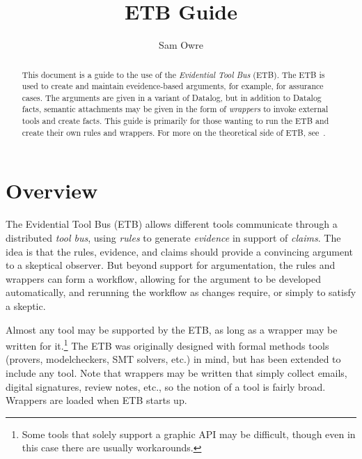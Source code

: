\documentclass{report}
\title{ETB Guide}
\author{Sam Owre}
\begin{document}
\maketitle
\tableofcontents

\begin{abstract}

This document is a guide to the use of the \textit{Evidential Tool Bus}
(ETB).  The ETB is used to create and maintain eveidence-based arguments,
for example, for assurance cases.  The arguments are given in a variant of
Datalog, but in addition to Datalog facts, semantic attachments may be
given in the form of \emph{wrappers} to invoke external tools and create
facts.  This guide is primarily for those wanting to run the ETB and
create their own rules and wrappers.  For more on the theoretical side of
ETB, see~\cite{DBLP:conf/vmcai/CruanesHOS13,
DBLP:conf/birthday/CruanesHMOS14}.

\end{abstract}


\chapter{Overview}

The Evidential Tool Bus (ETB) allows different tools communicate through a
distributed \emph{tool bus}, using \emph{rules} to generate
\emph{evidence} in support of \emph{claims}.  The idea is that the rules,
evidence, and claims should provide a convincing argument to a skeptical
observer.  But beyond support for argumentation, the rules and wrappers
can form a workflow, allowing for the argument to be developed automatically, 
and rerunning the workflow as changes require, or simply to satisfy a
skeptic.

Almost any tool may be supported by the ETB, as long as a wrapper may be
written for it.\footnote{Some tools that solely support a graphic API may be
difficult, though even in this case there are usually workarounds.}  The
ETB was originally designed with formal methods tools (provers,
modelcheckers, SMT solvers, etc.) in mind, but has been extended to
include any tool.  Note that wrappers may be written that simply collect
emails, digital signatures, review notes, etc., so the notion of a tool is
fairly broad.  Wrappers are loaded when ETB starts up.
\end{document}
